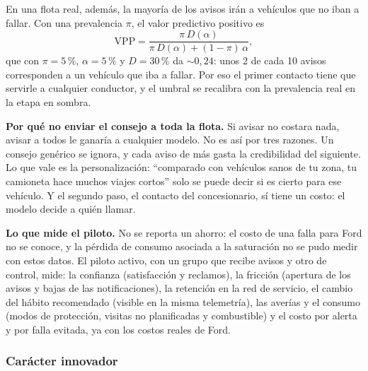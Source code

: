 En una flota real, además, la mayoría de los avisos irán a vehículos que no iban a fallar. Con una prevalencia $\pi$, el
valor predictivo positivo es
\begin{equation}
  \mathrm{VPP} = \frac{\pi\, D(\alpha)}{\pi\, D(\alpha) + (1 - \pi)\,\alpha},
  \label{eq:vpp}
\end{equation}
que con $\pi = 5\,\%$, $\alpha = 5\,\%$ y $D = 30\,\%$ da $\sim 0{,}24$: unos 2 de cada 10 avisos corresponden a un vehículo que
iba a fallar. Por eso el primer contacto tiene que servirle a cualquier conductor, y el umbral se recalibra con la
prevalencia real en la etapa en sombra.

\textbf{Por qué no enviar el consejo a toda la flota.} Si avisar no costara nada, avisar a todos le ganaría a cualquier
modelo. No es así por tres razones. Un consejo genérico se ignora, y cada aviso de más gasta la credibilidad del siguiente.
Lo que vale es la personalización: ``comparado con vehículos sanos de tu zona, tu camioneta hace muchos viajes cortos'' solo
se puede decir si es cierto para ese vehículo. Y el segundo paso, el contacto del concesionario, sí tiene un costo: el modelo
decide a quién llamar.

\textbf{Lo que mide el piloto.} No se reporta un ahorro: el costo de una falla para Ford no se conoce, y la pérdida de
consumo asociada a la saturación no se pudo medir con estos datos. El piloto activo, con un grupo que recibe avisos y otro
de control, mide: la confianza (satisfacción y reclamos), la fricción (apertura de los avisos y bajas de las
notificaciones), la retención en la red de servicio, el cambio del hábito recomendado (visible en la misma telemetría), las
averías y el consumo (modos de protección, visitas no planificadas y combustible) y el costo por alerta y por falla evitada,
ya con los costos reales de Ford.

\subsubsection{Carácter innovador}
\label{sec:innovacion}

